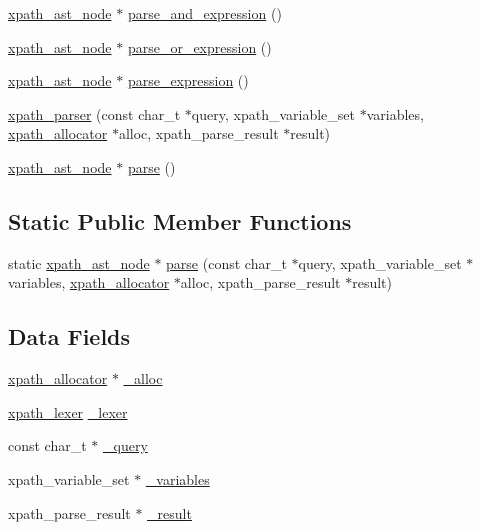 \begin{DoxyCompactItemize}
\item 
\hyperlink{classxpath__ast__node}{xpath\-\_\-ast\-\_\-node} $\ast$ \hyperlink{structxpath__parser_a84bbefffccb9fe91fec5c82aba2b6f02}{parse\-\_\-and\-\_\-expression} ()
\item 
\hyperlink{classxpath__ast__node}{xpath\-\_\-ast\-\_\-node} $\ast$ \hyperlink{structxpath__parser_a44768d5969dfb9b0a44e845551813c77}{parse\-\_\-or\-\_\-expression} ()
\item 
\hyperlink{classxpath__ast__node}{xpath\-\_\-ast\-\_\-node} $\ast$ \hyperlink{structxpath__parser_adb814ff3b99621d2a1c8e788ffd1c1c5}{parse\-\_\-expression} ()
\item 
\hyperlink{structxpath__parser_a3f5b4a04f4d0a0a44962d9825a86ed0d}{xpath\-\_\-parser} (const char\-\_\-t $\ast$query, xpath\-\_\-variable\-\_\-set $\ast$variables, \hyperlink{classxpath__allocator}{xpath\-\_\-allocator} $\ast$alloc, xpath\-\_\-parse\-\_\-result $\ast$result)
\item 
\hyperlink{classxpath__ast__node}{xpath\-\_\-ast\-\_\-node} $\ast$ \hyperlink{structxpath__parser_a581e576958037e1ab682fb952b3ada38}{parse} ()
\end{DoxyCompactItemize}
\subsection*{Static Public Member Functions}
\begin{DoxyCompactItemize}
\item 
static \hyperlink{classxpath__ast__node}{xpath\-\_\-ast\-\_\-node} $\ast$ \hyperlink{structxpath__parser_ab865a9a777b466365b3c4bd50290189d}{parse} (const char\-\_\-t $\ast$query, xpath\-\_\-variable\-\_\-set $\ast$variables, \hyperlink{classxpath__allocator}{xpath\-\_\-allocator} $\ast$alloc, xpath\-\_\-parse\-\_\-result $\ast$result)
\end{DoxyCompactItemize}
\subsection*{Data Fields}
\begin{DoxyCompactItemize}
\item 
\hyperlink{classxpath__allocator}{xpath\-\_\-allocator} $\ast$ \hyperlink{structxpath__parser_ac34f5b21ef406bec944286eee2f45836}{\-\_\-alloc}
\item 
\hyperlink{classxpath__lexer}{xpath\-\_\-lexer} \hyperlink{structxpath__parser_a50106db584946e67acd080ef5391a0f4}{\-\_\-lexer}
\item 
const char\-\_\-t $\ast$ \hyperlink{structxpath__parser_aaf5ea5d5be97cdd93adc7a719d8edc1c}{\-\_\-query}
\item 
xpath\-\_\-variable\-\_\-set $\ast$ \hyperlink{structxpath__parser_a3e0adfea7cc81c08b97ee1375831df6c}{\-\_\-variables}
\item 
xpath\-\_\-parse\-\_\-result $\ast$ \hyperlink{structxpath__parser_a9370fb875bfc49ca6e35f3165ecb1692}{\-\_\-result}
\end{DoxyCompactItemize}



